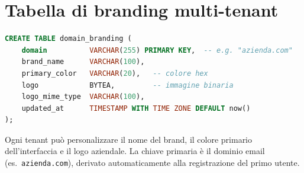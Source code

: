 \section{Tabella di branding multi-tenant}
\label{sec:branding_table}

\begin{lstlisting}[language=SQL, caption={DDL della tabella \texttt{domain\_branding}.}]
CREATE TABLE domain_branding (
    domain          VARCHAR(255) PRIMARY KEY,  -- e.g. "azienda.com"
    brand_name      VARCHAR(100),
    primary_color   VARCHAR(20),   -- colore hex
    logo            BYTEA,         -- immagine binaria
    logo_mime_type  VARCHAR(100),
    updated_at      TIMESTAMP WITH TIME ZONE DEFAULT now()
);
\end{lstlisting}

Ogni tenant pu\`o personalizzare il nome del brand, il colore primario dell'interfaccia
e il logo aziendale. La chiave primaria \`e il dominio email (es.\ \texttt{azienda.com}),
derivato automaticamente alla registrazione del primo utente.
